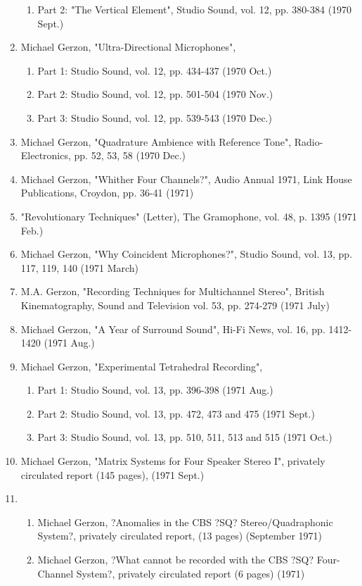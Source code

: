 \documentclass[9pt]{amsart}
\begin{document}
\begin{enumerate}
\begin{enumerate}
	\item Part 2: "The Vertical Element", Studio Sound, vol. 12, pp. 380-384 (1970 Sept.)
	\end{enumerate}
\item Michael Gerzon, "Ultra-Directional Microphones",
	\begin{enumerate}
	\item Part 1: Studio Sound, vol. 12, pp. 434-437 (1970 Oct.)
	\item Part 2: Studio Sound, vol. 12, pp. 501-504 (1970 Nov.)
	\item Part 3: Studio Sound, vol. 12, pp. 539-543 (1970 Dec.)
	\end{enumerate}
\item Michael Gerzon, "Quadrature Ambience with Reference Tone", Radio- Electronics, pp. 52, 53, 58 (1970 Dec.)
\item Michael Gerzon, "Whither Four Channels?", Audio Annual 1971, Link House Publications, Croydon, pp. 36-41 (1971)
\item "Revolutionary Techniques" (Letter), The Gramophone, vol. 48, p. 1395 (1971 Feb.)
\item Michael Gerzon, "Why Coincident Microphones?", Studio Sound, vol. 13, pp. 117, 119, 140 (1971 March)
\item M.A. Gerzon, "Recording Techniques for Multichannel Stereo", British Kinematography, Sound and Television vol. 53, pp. 274-279 (1971 July)
\item Michael Gerzon, "A Year of Surround Sound", Hi-Fi News, vol. 16, pp. 1412-1420 (1971 Aug.)
\item Michael Gerzon, "Experimental Tetrahedral Recording", 
	\begin{enumerate}
	\item Part 1: Studio Sound, vol. 13, pp. 396-398 (1971 Aug.)
	\item Part 2: Studio Sound, vol. 13, pp. 472, 473 and 475 (1971 Sept.)
	\item Part 3: Studio Sound, vol. 13, pp. 510, 511, 513 and 515 (1971 Oct.)
	\end{enumerate}
\item Michael Gerzon, "Matrix Systems for Four Speaker Stereo I", privately circulated report (145 pages), (1971 Sept.)
\item
	\begin{enumerate}
	\item Michael Gerzon, ?Anomalies in the CBS ?SQ? Stereo/Quadraphonic System?, privately circulated report, (13 pages) (September 1971)
	\item Michael Gerzon, ?What cannot be recorded with the CBS ?SQ? Four-Channel System?, privately circulated report (6 pages) (1971)

\end{enumerate}
\end{enumerate}
\end{document}
